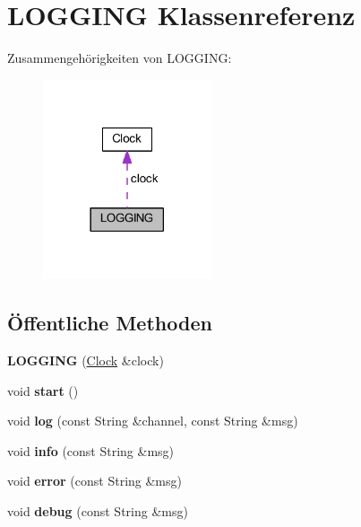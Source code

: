 \hypertarget{class_l_o_g_g_i_n_g}{}\section{L\+O\+G\+G\+I\+NG Klassenreferenz}
\label{class_l_o_g_g_i_n_g}


Zusammengehörigkeiten von L\+O\+G\+G\+I\+NG\+:
\nopagebreak
\begin{figure}[H]
\begin{center}
\leavevmode
\includegraphics[width=141pt]{class_l_o_g_g_i_n_g__coll__graph}
\end{center}
\end{figure}
\subsection*{Öffentliche Methoden}
\begin{DoxyCompactItemize}
\item 
\mbox{\label{class_l_o_g_g_i_n_g_a564b401f4aa450d865223b9a5c4c8c60}} 
{\bfseries L\+O\+G\+G\+I\+NG} (\hyperlink{class_clock}{Clock} \&clock)
\item 
\mbox{\label{class_l_o_g_g_i_n_g_a79b6818ba95833469ed99f0d7ba7cf74}} 
void {\bfseries start} ()
\item 
\mbox{\label{class_l_o_g_g_i_n_g_a180904184ab56e7673643878223b87bb}} 
void {\bfseries log} (const String \&channel, const String \&msg)
\item 
\mbox{\label{class_l_o_g_g_i_n_g_a2dc3d19674867ddcf69ff3326ddd2059}} 
void {\bfseries info} (const String \&msg)
\item 
\mbox{\label{class_l_o_g_g_i_n_g_a20592566f7123f4027c814fd77edeb8d}} 
void {\bfseries error} (const String \&msg)
\item 
\mbox{\label{class_l_o_g_g_i_n_g_a42b38c28ff116505e20d154507abfb06}} 
void {\bfseries debug} (const String \&msg)
\end{DoxyCompactItemize}
